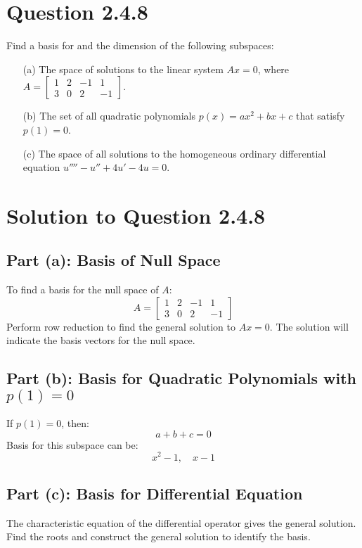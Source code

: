 \documentclass[12pt]{article}
\begin{document}
\newpage
\section*{Question 2.4.8}
Find a basis for and the dimension of the following subspaces:
\begin{itemize}
    \item[(a)] The space of solutions to the linear system \(Ax = 0\), where \(A = \begin{bmatrix} 1 & 2 & -1 & 1 \\ 3 & 0 & 2 & -1 \end{bmatrix}\).
    \item[(b)] The set of all quadratic polynomials \(p(x) = ax^2 + bx + c\) that satisfy \(p(1) = 0\).
    \item[(c)] The space of all solutions to the homogeneous ordinary differential equation \(u'''' - u'' + 4u' - 4u = 0\).
\end{itemize}

\section*{Solution to Question 2.4.8}

\subsection*{Part (a): Basis of Null Space}
To find a basis for the null space of \(A\):
\[
A = \begin{bmatrix} 1 & 2 & -1 & 1 \\ 3 & 0 & 2 & -1 \end{bmatrix}
\]
Perform row reduction to find the general solution to \(Ax = 0\). The solution will indicate the basis vectors for the null space.

\subsection*{Part (b): Basis for Quadratic Polynomials with \(p(1) = 0\)}
If \(p(1) = 0\), then:
\[
a + b + c = 0
\]
Basis for this subspace can be:
\[
x^2 - 1, \quad x - 1
\]

\subsection*{Part (c): Basis for Differential Equation}
The characteristic equation of the differential operator gives the general solution. Find the roots and construct the general solution to identify the basis.
\end{document}
